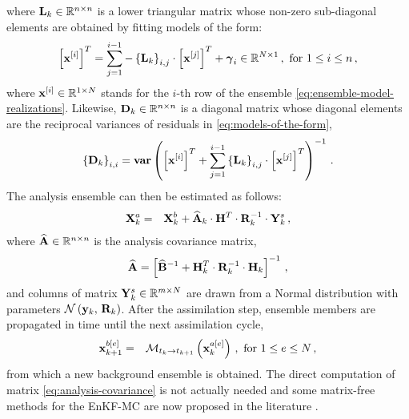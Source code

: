 %
where ${\bf L}_k \in \mathbb{R}^{n \times n}$ is a lower triangular matrix whose non-zero sub-diagonal elements are obtained by fitting models of the form:
\begin{eqnarray}
\label{eq:models-of-the-form}
\displaystyle
\left [ {\bf x}^{[i]} \right ]^T = \sum_{j=1}^{i-1} - \left \{  {\bf L}_k \right \}_{i,j} \cdot \left [ {\bf x}^{[j]} \right ]^T + \boldsymbol{\gamma}_i \in \mathbb{R}^{N \times 1} \,, \text{ for $1 \le i \le n$} \,,
\end{eqnarray}
%
where ${\bf x}^{[i]} \in \mathbb{R}^{1 \times N}$ stands for the $i$-th row of the ensemble \eqref{eq:ensemble-model-realizations}. Likewise, ${\bf D}_k \in \mathbb{R}^{n \times n}$ is a diagonal matrix whose diagonal elements are the reciprocal variances of residuals in \eqref{eq:models-of-the-form},
\begin{eqnarray}
\left \{ {\bf D}_k \right \}_{i,i} = {\bf var} \left ( \left [ {\bf x}^{[i]} \right ]^T + \sum_{j=1}^{i-1} \left \{  {\bf L}_k \right \}_{i,j} \cdot \left [ {\bf x}^{[j]} \right ]^T \right )^{-1} \,.
\end{eqnarray}
%
The analysis ensemble can then be estimated as follows:
\begin{eqnarray}
{\bf X}^a_k &=& {\bf X}^b_k + \widehat{\bf A}_k \cdot {\bf H}^T \cdot {\bf R}_k^{-1} \cdot {\bf Y}^s_k \,,
\end{eqnarray}
%
where $\widehat{\bf A} \in \mathbb{R}^{n \times n}$ is the analysis covariance matrix,
\begin{eqnarray}
\label{eq:analysis-covariance}
\displaystyle
\widehat{\bf A} = \left [ \widehat{\bf B}^{-1} + {\bf H}_k^T \cdot {\bf R}^{-1}_k \cdot {\bf H}_k \right ]^{-1} \,,
\end{eqnarray} 
%
and columns of matrix ${\bf Y}^s_k \in \mathbb{R}^{m \times N}$ are drawn from a Normal distribution with parameters $\mathcal{N} \left ( {\bf y}_k,\,{\bf R}_k \right )$. After the assimilation step, ensemble members are propagated in time until the next assimilation cycle,
\begin{eqnarray*}
\displaystyle
{\bf x}^{b[e]}_{k+1} &=& \mathcal{M}_{t_{k} \rightarrow t_{k+1}} \left ( {\bf x}^{a[e]}_{k} \right ) \,,  \text{ for $1 \le e \le N$} \,,
\end{eqnarray*}
%
from which a new background ensemble is obtained. The direct computation of matrix \eqref{eq:analysis-covariance} is not actually needed and some matrix-free methods for the EnKF-MC are now proposed in the literature \cite{nino2017posterior,nino2017matrix}.

